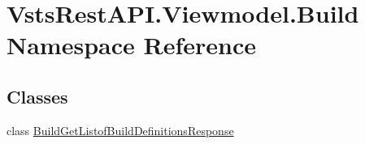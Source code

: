 \hypertarget{namespace_vsts_rest_a_p_i_1_1_viewmodel_1_1_build}{}\section{Vsts\+Rest\+A\+P\+I.\+Viewmodel.\+Build Namespace Reference}
\label{namespace_vsts_rest_a_p_i_1_1_viewmodel_1_1_build}
\subsection*{Classes}
\begin{DoxyCompactItemize}
\item 
class \mbox{\hyperlink{class_vsts_rest_a_p_i_1_1_viewmodel_1_1_build_1_1_build_get_listof_build_definitions_response}{Build\+Get\+Listof\+Build\+Definitions\+Response}}
\end{DoxyCompactItemize}
